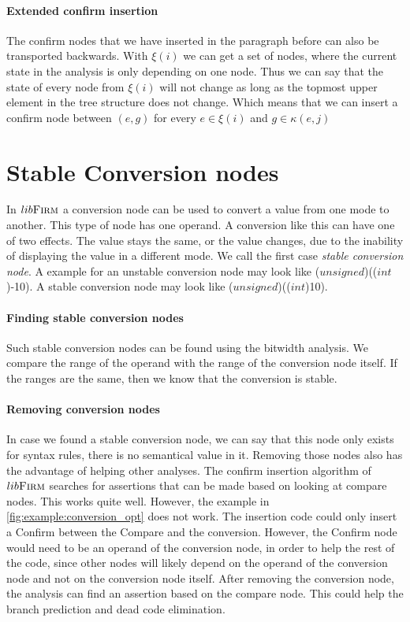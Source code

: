 \paragraph{Extended confirm insertion}
The confirm nodes that we have inserted in the paragraph before can also be transported backwards.
With $\xi(i)$ we can get a set of nodes, where the current state in the analysis is only depending on one node. Thus we can say that the state of every node from $\xi(i)$ will not change as long as the topmost upper element in the tree structure does not change. Which means that we can insert a confirm node between $(e,g)$ for every $e \in \xi(i)$ and $g \in \kappa(e, j)$

\section{Stable Conversion nodes}
In $lib\textsc{Firm}$ a conversion node can be used to convert a value from one mode to another. This type of node has one operand. A conversion like this can have one of two effects. The value stays the same, or the value changes, due to the inability of displaying the value in a different mode. We call the first case \textit{stable conversion node}. A example for an unstable conversion node may look like ($unsigned$)(($int$)-10). A stable conversion node may look like ($unsigned$)(($int$)10).

\paragraph{Finding stable conversion nodes}
Such stable conversion nodes can be found using the bitwidth analysis. We compare the range of the operand with the range of the conversion node itself. If the ranges are the same, then we know that the conversion is stable.

\paragraph{Removing conversion nodes}

In case we found a stable conversion node, we can say that this node only exists for syntax rules, there is no semantical value in it. Removing those nodes also has the advantage of helping other analyses. 
The confirm insertion algorithm of $lib\textsc{Firm}$  searches for assertions that can be made based on looking at compare nodes. This works quite well. However, the example in \autoref{fig:example:conversion_opt} does not work.
The insertion code could only insert a Confirm between the Compare and the conversion. However, the Confirm node would need to be an operand of the conversion node, in order to help the rest of the code, since other nodes will likely depend on the operand of the conversion node and not on the conversion node itself. 
After removing the conversion node, the analysis can find an assertion based on the compare node. This could help the branch prediction and dead code elimination.

